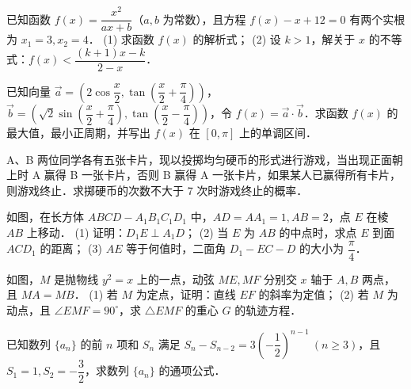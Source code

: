 \begin{question}
已知函数 $f(x) = \dfrac{x^2}{ax + b}$（$a, b$ 为常数），且方程 $f(x) - x + 12 = 0$ 有两个实根为 $x_1 = 3, x_2 = 4$．
(1) 求函数 $f(x)$ 的解析式；
(2) 设 $k > 1$，解关于 $x$ 的不等式：$f(x) < \dfrac{(k+1)x - k}{2-x}$．

\end{question}
\begin{question}
已知向量 $\vec{a} = \left(2\cos\dfrac{x}{2}, \tan\left(\dfrac{x}{2} + \dfrac{\pi}{4}\right)\right)$，$\vec{b} = \left(\sqrt{2}\sin\left(\dfrac{x}{2} + \dfrac{\pi}{4}\right), \tan\left(\dfrac{x}{2} - \dfrac{\pi}{4}\right)\right)$，令 $f(x) = \vec{a} \cdot \vec{b}$．求函数 $f(x)$ 的最大值，最小正周期，并写出 $f(x)$ 在 $[0, \pi]$ 上的单调区间．

\end{question}
\begin{question}
A、B 两位同学各有五张卡片，现以投掷均匀硬币的形式进行游戏，当出现正面朝上时 A 赢得 B 一张卡片，否则 B 赢得 A 一张卡片，如果某人已赢得所有卡片，则游戏终止．求掷硬币的次数不大于 7 次时游戏终止的概率．

\Needspace{0.4\textheight}
\end{question}
\begin{question}
如图，在长方体 $ABCD - A_1B_1C_1D_1$ 中，$AD = AA_1 = 1, AB = 2$，点 $E$ 在棱 $AB$ 上移动．
(1) 证明：$D_1E \perp A_1D$；
(2) 当 $E$ 为 $AB$ 的中点时，求点 $E$ 到面 $ACD_1$ 的距离；
(3) $AE$ 等于何值时，二面角 $D_1 - EC - D$ 的大小为 $\dfrac{\pi}{4}$．
\nopagebreak[4]
\begin{center}\end{center}
\nopagebreak[4]
\Needspace{0.4\textheight}
\end{question}
\begin{question}
如图，$M$ 是抛物线 $y^2 = x$ 上的一点，动弦 $ME, MF$ 分别交 $x$ 轴于 $A, B$ 两点，且 $MA = MB$．
(1) 若 $M$ 为定点，证明：直线 $EF$ 的斜率为定值；
(2) 若 $M$ 为动点，且 $\angle EMF = 90^\circ$，求 $\triangle EMF$ 的重心 $G$ 的轨迹方程．
\nopagebreak[4]
\begin{center}\end{center}
\nopagebreak[4]
\end{question}
\begin{question}
已知数列 $\{a_n\}$ 的前 $n$ 项和 $S_n$ 满足 $S_n - S_{n-2} = 3\left(-\dfrac{1}{2}\right)^{n-1}\ (n \geqslant 3)$，且 $S_1 = 1, S_2 = -\dfrac{3}{2}$，求数列 $\{a_n\}$ 的通项公式．

\end{question}